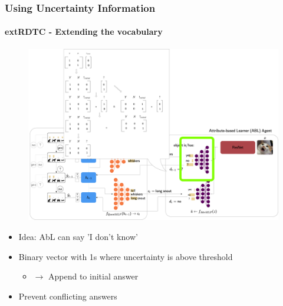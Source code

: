 \documentclass[9pt]{beamer}
\begin{document}
\begin{frame}
\frametitle{Using Uncertainty Information}
\framesubtitle{\textbf{extRDTC} - Extending the vocabulary}
\begin{figure}
	\includegraphics[width=0.8\linewidth]{images/how_to_extRDTC.pdf}
\end{figure}
\begin{itemize}
	\item Idea: AbL can say 'I don't know'
	\item Binary vector with 1s where uncertainty is above threshold
	\begin{itemize}
			\item $\rightarrow$ Append to  initial answer%
	\end{itemize}
	\item Prevent conflicting answers
\end{itemize}
\end{frame}



\end{document}

